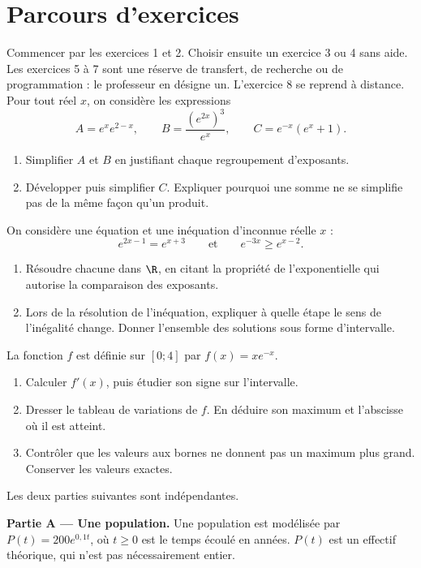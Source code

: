 \section*{Parcours d’exercices}\label{C09-PARC}
Commencer par les exercices 1 et 2. Choisir ensuite un exercice 3 ou 4 sans aide. Les exercices 5 à 7 sont une réserve de transfert, de recherche ou de programmation : le professeur en désigne un. L’exercice 8 se reprend à distance.
\begingroup
{}
Pour tout réel $x$, on considère les expressions\[A=e^xe^{2-x},\qquad B=\dfrac{(e^{2x})^3}{e^x},\qquad C=e^{-x}(e^x+1).\]
\begin{enumerate}[label=\arabic*.]
\item Simplifier $A$ et $B$ en justifiant chaque regroupement d’exposants.
\item Développer puis simplifier $C$. Expliquer pourquoi une somme ne se simplifie pas de la même façon qu’un produit.
\end{enumerate}
On considère une équation et une inéquation d’inconnue réelle $x$ :\[e^{2x-1}=e^{x+3}\qquad\text{et}\qquad e^{-3x}\geq e^{x-2}.\]
\begin{enumerate}[label=\arabic*.]
\item Résoudre chacune dans $\R$, en citant la propriété de l’exponentielle qui autorise la comparaison des exposants.
\item Lors de la résolution de l’inéquation, expliquer à quelle étape le sens de l’inégalité change. Donner l’ensemble des solutions sous forme d’intervalle.
\end{enumerate}
La fonction $f$ est définie sur $[0;4]$ par $f(x)=xe^{-x}$.
\begin{enumerate}[label=\arabic*.]
\item Calculer $f\prime(x)$, puis étudier son signe sur l’intervalle.
\item Dresser le tableau de variations de $f$. En déduire son maximum et l’abscisse où il est atteint.
\item Contrôler que les valeurs aux bornes ne donnent pas un maximum plus grand. Conserver les valeurs exactes.
\end{enumerate}
Les deux parties suivantes sont indépendantes.\par\textbf{Partie A — Une population.} Une population est modélisée par $P(t)=200e^{0{,}1t}$, où $t\geq0$ est le temps écoulé en années. $P(t)$ est un effectif théorique, qui n’est pas nécessairement entier.

